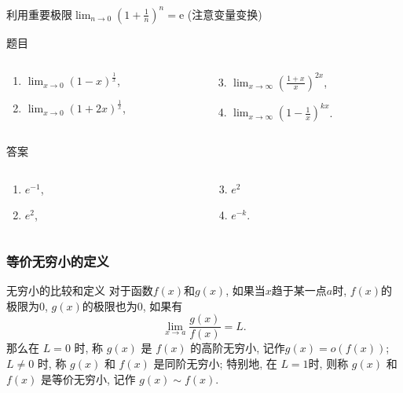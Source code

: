 \documentclass[
10pt,
aspectratio=43,
]{beamer}
\begin{document}
\begin{frame}{利用重要极限$\displaystyle\lim_{n\to0}(1+\frac{1}{n})^n=\mathrm{e}$ (注意变量变换)}
	\begin{block}{题目}
		\begin{columns}[onlytextwidth]
			\begin{column}{0.5\textwidth}
				\begin{enumerate}
					\item $\displaystyle\lim _{x \rightarrow 0}(1-x)^{\frac{1}{x}}$,
					\item $\displaystyle\lim _{x \rightarrow 0}(1+2 x)^{\frac{1}{x}}$,
				\end{enumerate}
			\end{column}
			\begin{column}{0.5\textwidth}
				\begin{enumerate}
					\setcounter{enumi}{2}
					\item $\displaystyle\lim _{x \rightarrow \infty}\left(\frac{1+x}{x}\right)^{2 x}$,
					\item $\displaystyle\lim _{x \rightarrow \infty}\left(1-\frac{1}{x}\right)^{k x}$.
				\end{enumerate}
			\end{column}
		\end{columns}
	\end{block}
	\begin{exampleblock}{答案}
		\begin{columns}[onlytextwidth]
			\begin{column}{0.5\textwidth}
				\begin{enumerate}
					\item $e^{-1}$,
					      \pause
					\item $e^2$,
				\end{enumerate}
			\end{column}
			\begin{column}{0.5\textwidth}
				\begin{enumerate}
					\setcounter{enumi}{2}
					\pause
					\item $e^2$
					      \pause
					\item $e^{-k}$.
				\end{enumerate}
			\end{column}
		\end{columns}
	\end{exampleblock}
\end{frame}

\begin{frame}
	\frametitle{等价无穷小的定义}
	\begin{block}{无穷小的比较和定义}
		对于函数$f(x)$和$g(x)$, 如果当$x$趋于某一点$a$时, $f(x)$的极限为$0$, $g(x)$的极限也为$0$, 如果有
		\[
			\lim_{x\to a}\frac{g(x)}{f(x)}=L.
		\]
		那么在 $L=0$ 时, 称 $g(x)$ 是 $f(x)$ 的高阶无穷小, 记作$g(x)= o(f(x))$; $L\neq0$ 时, 称 $g(x)$ 和 $f(x)$ 是同阶无穷小; 特别地, 在 $L=1$时, 则称 $g(x)$ 和 $f(x)$ 是等价无穷小, 记作 $g(x)\sim f(x)$.
	\end{block}
\end{frame}
\end{document}
